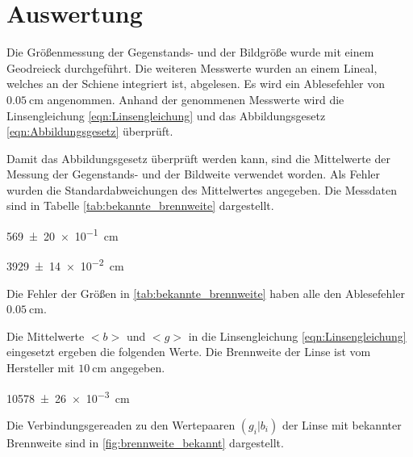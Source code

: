 \section{Auswertung}

Die Größenmessung der Gegenstands- und der Bildgröße wurde mit einem Geodreieck durchgeführt.
Die weiteren Messwerte wurden an einem Lineal, welches an der Schiene integriert
ist, abgelesen. Es wird ein Ablesefehler von $\SI{0,05}{\centi\meter}$ angenommen.
Anhand der genommenen Messwerte wird die Linsengleichung \eqref{eqn:Linsengleichung} und das
Abbildungsgesetz \eqref{eqn:Abbildungsgesetz} überprüft.

Damit das Abbildungsgesetz überprüft werden kann, sind die Mittelwerte der Messung
der Gegenstands- und der Bildweite verwendet worden. Als Fehler wurden die
Standardabweichungen des Mittelwertes angegeben.
Die Messdaten sind in Tabelle \ref{tab:bekannte_brennweite} dargestellt.

\begin{description}
  \centering
  \item[$\frac{B}{G}=$]\SI{569(20)e-1}{\centi\meter}
  \item[$\frac{<b>}{<g>}=$]\SI{3929(14)e-2}{\centi\meter}
\end{description}



Die Fehler der Größen in \ref{tab:bekannte_brennweite} haben alle den Ablesefehler
$\SI{0,05}{\centi\meter}$.

Die Mittelwerte $<b>$ und $<g>$ in die Linsengleichung \eqref{eqn:Linsengleichung} eingesetzt
ergeben die folgenden
Werte. Die Brennweite der Linse ist vom Hersteller mit $\SI{10}{\centi\meter}$
angegeben.

\begin{description}
  \centering
  \item[$<f_1>\ua{gemessen}=$]\SI{10578(26)e-3}{\centi\meter}
\end{description}

Die Verbindungsgereaden zu den Wertepaaren $(g_i|b_i)$ der Linse mit bekannter
Brennweite sind in \ref{fig:brennweite_bekannt}
dargestellt.

